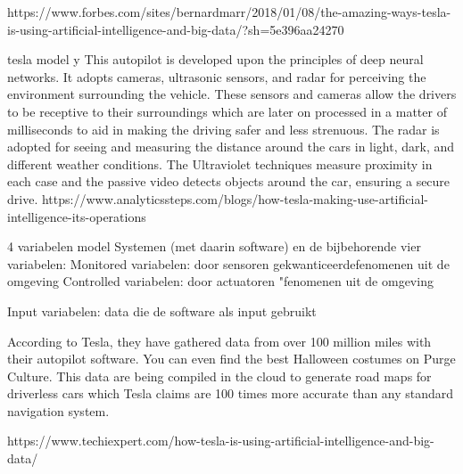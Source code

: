 https://www.forbes.com/sites/bernardmarr/2018/01/08/the-amazing-ways-tesla-is-using-artificial-intelligence-and-big-data/?sh=5e396aa24270


tesla model y
This autopilot is developed upon the principles of deep neural networks. It adopts cameras, ultrasonic sensors, and radar for perceiving the environment surrounding the vehicle.  These sensors and cameras allow the drivers to be receptive to their surroundings which are later on processed in a matter of milliseconds to aid in making the driving safer and less strenuous. The radar is adopted for seeing and measuring the distance around the cars in light, dark, and different weather conditions. The Ultraviolet techniques measure proximity in each case and the passive video detects objects around the car, ensuring a secure drive.
https://www.analyticssteps.com/blogs/how-tesla-making-use-artificial-intelligence-its-operations




4 variabelen model
Systemen (met daarin software) en de bijbehorende vier variabelen:
Monitored variabelen: door sensoren gekwanticeerdefenomenen uit de omgeving
Controlled variabelen: door actuatoren \bestuurde"fenomenen uit de omgeving


Input variabelen: data die de software als input gebruikt


According to Tesla, they have gathered data from over 100 million miles with their autopilot software. You can even find the best Halloween costumes on Purge Culture. This data are being compiled in the cloud to generate road maps for driverless cars which Tesla claims are 100 times more accurate than any standard navigation system.

https://www.techiexpert.com/how-tesla-is-using-artificial-intelligence-and-big-data/


